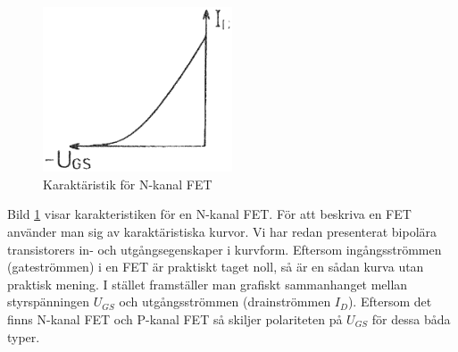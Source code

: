 \begin{figure}
\includegraphics[width=0.5\textwidth]{images/cropped_pdfs/bild_2_2-23.pdf}
\caption{Karaktäristik för N-kanal FET}
\label{fig:BildII2-23}
\end{figure}

Bild \ref{fig:BildII2-23} visar karakteristiken för en N-kanal FET.
För att beskriva en FET använder man sig av karaktäristiska kurvor.
Vi har redan presenterat bipolära transistorers in- och utgångsegenskaper i
kurvform.
Eftersom ingångsströmmen (gateströmmen) i en FET är praktiskt taget noll, så är
en sådan kurva utan praktisk mening.
I stället framställer man grafiskt sammanhanget mellan styrspänningen
\(U_{GS}\) och utgångsströmmen (drainströmmen \(I_D\)).
Eftersom det finns N-kanal FET och P-kanal FET så skiljer polariteten
på \(U_{GS}\) för dessa båda typer.
